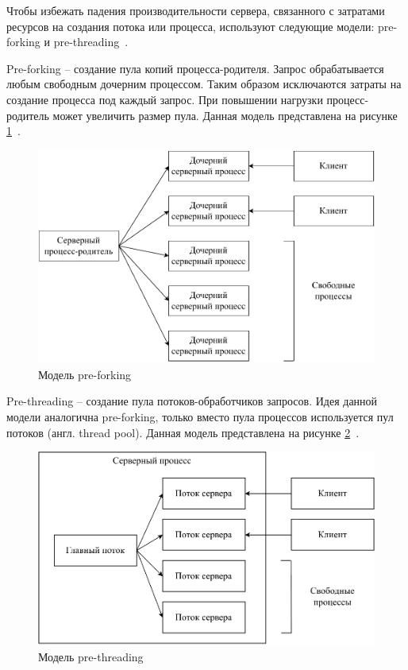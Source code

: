 Чтобы избежать падения производительности сервера, связанного с затратами ресурсов на создания потока или процесса, используют следующие модели: pre-forking и pre-threading~\cite{Tiwari2012ASP}.

Pre-forking -- создание пула копий процесса-родителя. Запрос обрабатывается любым свободным дочерним процессом. Таким образом исключаются затраты на создание процесса под каждый запрос. При повышении нагрузки процесс-родитель может увеличить размер пула. Данная модель представлена на рисунке \ref{prefork}~\cite{Tiwari2012ASP}.

\begin{figure}[ht]
	\centering
	\includegraphics[scale=0.8]{img/prefork.pdf}
	\caption{Модель pre-forking}
	\label{prefork}
\end{figure}
	
Pre-threading -- создание пула потоков-обработчиков запросов. Идея данной модели аналогична pre-forking, только вместо пула процессов используется пул потоков (англ. thread pool). Данная модель представлена на рисунке \ref{prethread}~\cite{Tiwari2012ASP}.

\begin{figure}[ht]
	\centering
	\includegraphics[scale=0.8]{img/prethread.pdf}
	\caption{Модель pre-threading}
	\label{prethread}
\end{figure}

